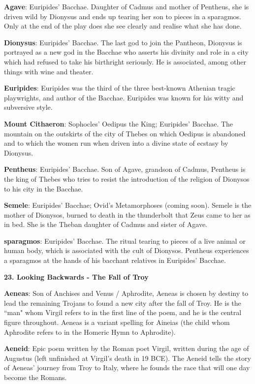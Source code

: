 \documentclass{scrartcl}
\begin{document}
\begin{multicols*}{3}
{\bf Agave}: Euripides' Bacchae. Daughter of Cadmus and mother of Pentheus, she is driven wild by Dionysus and ends up tearing her son to pieces in a sparagmos. Only at the end of the play does she see clearly and realise what she has done.

{\bf Dionysus}: Euripides' Bacchae. The last god to join the Pantheon, Dionysus is portrayed as a new god in the Bacchae who asserts his divinity and role in a city which had refused to take his birthright seriously. He is associated, among other things with wine and theater.

{\bf Euripides}: Euripides was the third of the three best-known Athenian tragic playwrights, and author of the Bacchae. Euripides was known for his witty and subversive style.

{\bf Mount Cithaeron}: Sophocles' Oedipus the King; Euripides' Bacchae. The mountain on the outskirts of the city of Thebes on which Oedipus is abandoned and to which the women run when driven into a divine state of ecstasy by Dionysus.

{\bf Pentheus}: Euripides' Bacchae. Son of Agave, grandson of Cadmus, Pentheus is the king of Thebes who tries to resist the introduction of the religion of Dionysos to his city in the Bacchae.

{\bf Semele}: Euripides' Bacchae; Ovid's Metamorphoses (coming soon). Semele is the mother of Dionysos, burned to death in the thunderbolt that Zeus came to her as in bed. She is the Theban daughter of Cadmus and sister of Agave.

{\bf sparagmos}: Euripides' Bacchae. The ritual tearing to pieces of a live animal or human body, which is associated with the cult of Dionysos. Pentheus experiences a sparagmos at the hands of his bacchant relatives in Euripides' Bacchae.


{\bf 23. Looking Backwards - The Fall of Troy}


{\bf Aeneas}: Son of Anchises and Venus / Aphrodite, Aeneas is chosen by destiny to lead the remaining Trojans to found a new city after the fall of Troy. He is the ``man" whom Virgil refers to in the first line of the poem, and he is the central figure throughout. Aeneas is a variant spelling for Aineias (the child whom Aphrodite refers to in the Homeric Hymn to Aphrodite).

{\bf Aeneid}: Epic poem written by the Roman poet Virgil, written during the age of Augustus (left unfinished at Virgil's death in 19 BCE). The Aeneid tells the story of Aeneas' journey from Troy to Italy, where he founds the race that will one day become the Romans.


\end{multicols*}
\end{document}
